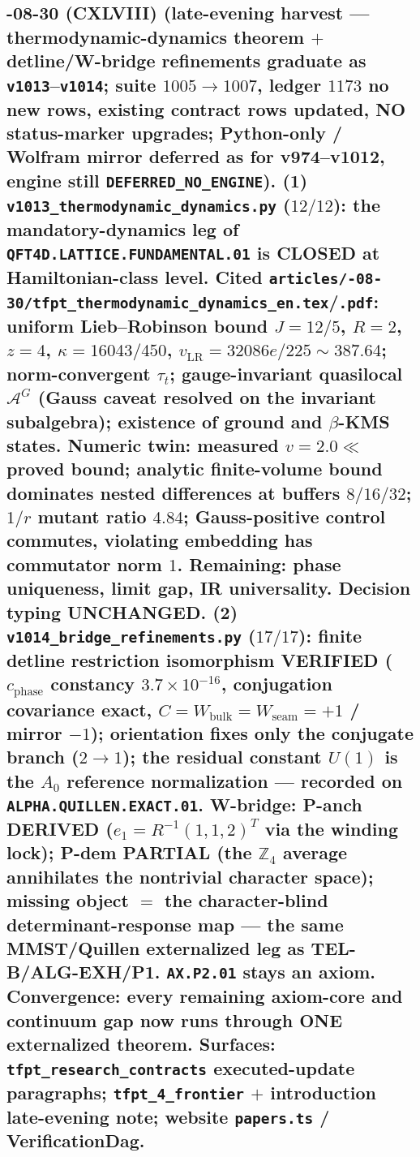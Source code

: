 \documentclass[11pt]{article}
\begin{document}
\subsection*{-08-30 (CXLVIII) (late-evening harvest --- thermodynamic-dynamics theorem $+$ detline/W-bridge refinements graduate as \texttt{v1013}--\texttt{v1014}; suite $1005 \to 1007$, ledger $1173$ no new rows, existing contract rows updated, NO status-marker upgrades; Python-only / Wolfram mirror deferred as for v974--v1012, engine still \texttt{DEFERRED\_NO\_ENGINE}).  \textbf{(1)} \texttt{v1013\_\allowbreak thermodynamic\_\allowbreak dynamics.py} ($12/12$): the mandatory-dynamics leg of \texttt{QFT4D.LATTICE.FUNDAMENTAL.01} is CLOSED at Hamiltonian-class level.  Cited \texttt{articles/-08-30/\allowbreak tfpt\_\allowbreak thermodynamic\_\allowbreak dynamics\_\allowbreak en.tex}/\texttt{.pdf}: uniform Lieb--Robinson bound $J=12/5$, $R=2$, $z=4$, $\kappa=16043/450$, $v_{\mathrm{LR}}=32086e/225\sim387.64$; norm-convergent $\tau_t$; gauge-invariant quasilocal $\mathcal A^G$ (Gauss caveat resolved on the invariant subalgebra); existence of ground and $\beta$-KMS states.  Numeric twin: measured $v=2.0\ll$ proved bound; analytic finite-volume bound dominates nested differences at buffers $8/16/32$; $1/r$ mutant ratio $4.84$; Gauss-positive control commutes, violating embedding has commutator norm $1$.  Remaining: phase uniqueness, limit gap, IR universality.  Decision typing UNCHANGED.  \textbf{(2)} \texttt{v1014\_\allowbreak bridge\_\allowbreak refinements.py} ($17/17$): finite detline restriction isomorphism VERIFIED ($c_{\mathrm{phase}}$ constancy $3.7{\times}10^{-16}$, conjugation covariance exact, $C=W_{\mathrm{bulk}}=W_{\mathrm{seam}}=+1$ / mirror $-1$); orientation fixes only the conjugate branch ($2\to1$); the residual constant $U(1)$ is the $A_0$ reference normalization --- recorded on \texttt{ALPHA.QUILLEN.EXACT.01}.  W-bridge: P-anch DERIVED ($e_1=R^{-1}(1,1,2)^T$ via the winding lock); P-dem PARTIAL (the $\mathbb Z_4$ average annihilates the nontrivial character space); missing object $=$ the character-blind determinant-response map --- the same MMST/Quillen externalized leg as TEL-B/ALG-EXH/P1.  \texttt{AX.P2.01} stays an axiom.  Convergence: every remaining axiom-core and continuum gap now runs through ONE externalized theorem.  Surfaces: \texttt{tfpt\_research\_contracts} executed-update paragraphs; \texttt{tfpt\_4\_frontier} $+$ introduction late-evening note; website \texttt{papers.ts} / VerificationDag.}
\end{document}
